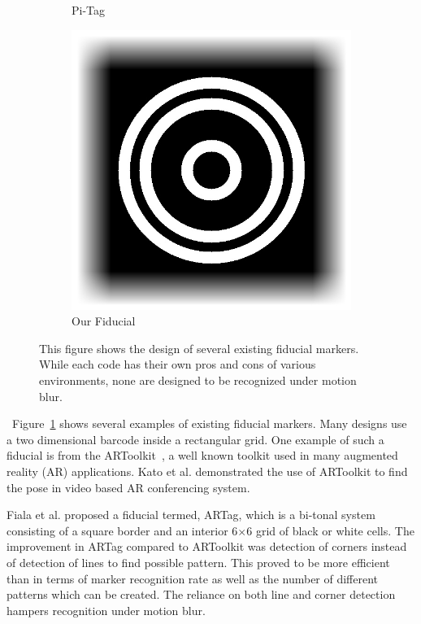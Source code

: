 \documentclass[runningheads]{llncs}
\begin{document}
\begin{figure}
\begin{subfigure}[b]{0.14\textwidth}
  Pi-Tag\quad\cite{Pitag13}
 \end{subfigure}\quad
 \begin{subfigure}[b]{0.14\textwidth}
  \centering
  \includegraphics[width=\linewidth]{our_fiducial}
  Our Fiducial
 \end{subfigure}
 \caption{This figure shows the design of several existing fiducial markers.  While
 each code has their own pros and cons of various environments, none are
 designed to be recognized under motion blur.}
 \label{fig:previous_work}
\end{figure}

~Figure~\ref{fig:previous_work} shows several
examples of existing fiducial markers.  Many designs use a two dimensional
barcode inside a rectangular grid. One example of such a fiducial is from the 
ARToolkit~\cite{ARToolkit02}, a well known toolkit used in many augmented reality (AR) applications. Kato et al.\cite{kato-artoolkit} demonstrated the use of ARToolkit
to find the pose in video based AR conferencing system. 

Fiala et al. \cite{Fiala05} proposed a fiducial termed, ARTag, which is a
bi-tonal system consisting of a square border and an interior 6$\times$6 grid of black or white cells. The improvement in ARTag compared to
ARToolkit was detection of corners instead of detection of lines to find
possible pattern. This proved to be more efficient than \cite{ARToolkit02} in
terms of marker recognition rate as well as the number of different patterns
which can be created.   The reliance on both line and corner detection hampers recognition under motion blur.
\end{document}
